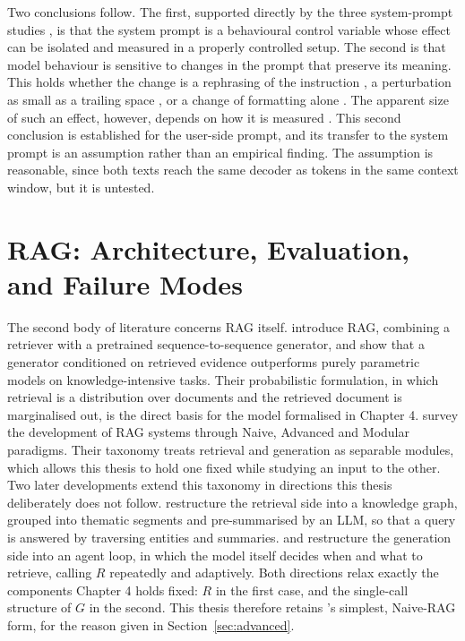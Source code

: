 \documentclass[12pt,a4paper,oneside]{scrreprt}
\begin{document}
Two conclusions follow. The first, supported directly by the three system-prompt studies \citep{cheng2026systemprompts,mu2025robustness,zheng2024helpful}, is that the system prompt is a behavioural control variable whose effect can be isolated and measured in a properly controlled setup.
The second is that model behaviour is sensitive to changes in the prompt that preserve its meaning. This holds whether the change is a rephrasing of the instruction \citep{zhuo2024prosa}, a perturbation as small as a trailing space \citep{salinas2024butterfly}, or a change of formatting alone \citep{sclar2024quantifying}. The apparent size of such an effect, however, depends on how it is measured \citep{hua2025flaw}. This second conclusion is established
for the user-side prompt, and its transfer to the system prompt is an assumption rather than an empirical finding. The assumption is reasonable, since both texts reach the
same decoder as tokens in the same context window, but it is untested.

\section{RAG: Architecture, Evaluation, and Failure Modes}

The second body of literature concerns RAG itself.
\citet{lewis2020rag} introduce RAG, combining a
retriever with a pretrained sequence-to-sequence generator, and show that a generator conditioned on retrieved evidence outperforms purely
parametric models on knowledge-intensive tasks. Their probabilistic formulation,
in which retrieval is a distribution over documents and the retrieved document is
marginalised out, is the direct basis for the model formalised in Chapter 4.
\citet{gao2023survey} survey the development of RAG systems through Naive,
Advanced and Modular paradigms. Their taxonomy treats retrieval and generation as
separable modules, which allows this thesis to hold one fixed while
studying an input to the other. Two later developments
extend this taxonomy in directions this thesis deliberately does not follow.
\citet{edge2024graphrag} restructure the retrieval side into a knowledge graph,
grouped into thematic segments and pre-summarised by an LLM, so that a query is
answered by traversing entities and summaries. \citet{singh2025agentic} and
\citet{jin2025searchr1} restructure the generation side into an agent loop, in
which the model itself decides when and what to retrieve, calling $R$ repeatedly
and adaptively. Both directions relax exactly the components Chapter 4
holds fixed: $R$ in the first case, and the single-call structure of $G$ in the
second. This thesis therefore retains \citeauthor{gao2023survey}'s simplest,
Naive-RAG form, for the reason given in Section~\ref{sec:advanced}.
\end{document}
